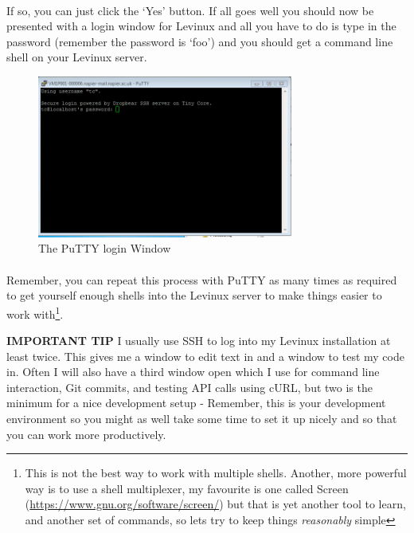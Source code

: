 \documentclass[12pt, a4paper, twoside]{book}
\begin{document}
\paragraph{} If so, you can just click the `Yes' button. If all goes well you should now be presented with a login window for Levinux and all you have to do is type in the password (remember the password is `foo') and you should get a command line shell on your Levinux server.

\begin{figure}[H]
\centering
\includegraphics[width=0.75\textwidth]{images/putty_login.png}
\caption{The PuTTY login Window}
\label{fig:putty-login}
\end{figure}

\paragraph{} Remember, you can repeat this process with PuTTY as many times as required to get yourself enough shells into the Levinux server to make things easier to work with\footnote{This is not the best way to work with multiple shells. Another, more powerful way is to use a shell multiplexer, my favourite is one called Screen (\url{https://www.gnu.org/software/screen/}) but that is yet another tool to learn, and another set of commands, so lets try to keep things \emph{reasonably} simple}.

\begin{framed}
\textbf{IMPORTANT TIP} I usually use SSH to log into my Levinux installation at least twice. This gives me a window to edit text in and a window to test my code in. Often I will also have a third window open which I use for command line interaction, Git commits, and testing API calls using cURL, but two is the minimum for a nice development setup - Remember, this is your development environment so you might as well take some time to set it up nicely and so that you can work more productively.
\end{framed}
\end{document}
